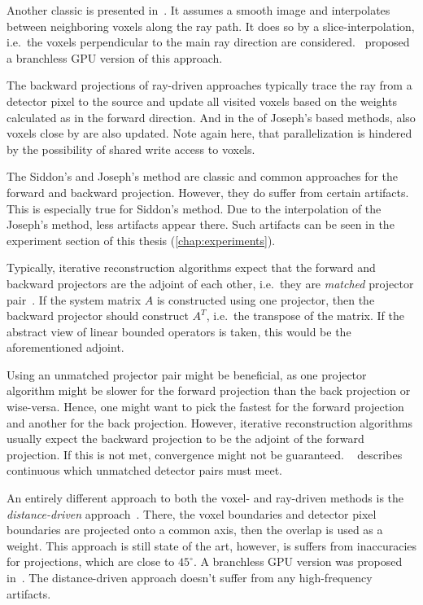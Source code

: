 Another classic is presented in~\cite{joseph_improved_1982}. It assumes a smooth image and
interpolates between neighboring voxels along the ray path. It does so by a slice-interpolation,
i.e.\ the voxels perpendicular to the main ray direction are considered.~\cite{graetz_high_2020}
proposed a branchless \gls{GPU} version of this approach.

The backward projections of ray-driven approaches typically trace the ray from a detector pixel to
the source and update all visited voxels based on the weights calculated as in the forward
direction. And in the of Joseph's based methods, also voxels close by are also updated. Note again
here, that parallelization is hindered by the possibility of shared write access to voxels.

The Siddon's and Joseph's method are classic and common approaches for the forward and backward
projection. However, they do suffer from certain artifacts. This is especially true for Siddon's
method. Due to the interpolation of the Joseph's method, less artifacts appear there. Such artifacts
can be seen in the experiment section of this thesis (\autoref{chap:experiments}).

Typically, iterative reconstruction algorithms expect that the forward and backward projectors are
the adjoint of each other, i.e.\ they are \textit{matched} projector
pair~\cite{zeng_unmatched_2000}. If the system matrix \(A\) is constructed using one projector, then
the backward projector should construct \(A^T\), i.e.\ the transpose of the matrix. If the abstract
view of linear bounded operators is taken, this would be the aforementioned adjoint.

Using an unmatched projector pair might be beneficial, as one projector algorithm might be slower
for the forward projection than the back projection or wise-versa. Hence, one might want to pick the
fastest for the forward projection and another for the back projection. However, iterative
reconstruction algorithms usually expect the backward projection to be the adjoint of the forward
projection. If this is not met, convergence might not be guaranteed.
\citeauthor*{zeng_unmatched_2000}~\cite{zeng_unmatched_2000} describes continuous which unmatched
detector pairs must meet.

An entirely different approach to both the voxel- and ray-driven methods is the
\textit{distance-driven} approach~\cite{de_man_distance-driven_2002, de_man_distance-driven_2004}.
There, the voxel boundaries and detector pixel boundaries are projected onto a common axis, then the
overlap is used as a weight. This approach is still state of the art, however, is suffers from
inaccuracies for projections, which are close to \(45^\circ\). A branchless \gls{GPU} version was
proposed in~\cite{liu_gpu-based_2017}. The distance-driven approach doesn't suffer from any
high-frequency artifacts.

